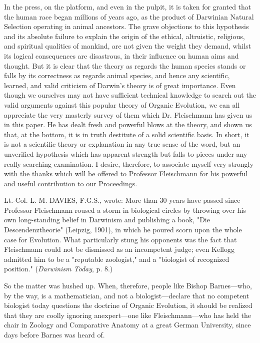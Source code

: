 In the press, on the platform, and even in the pulpit, it is taken for granted that the human
race began millions of years ago, as the product of Darwinian Natural Selection operating in
animal ancestors. The grave objections to this hypothesis and its absolute failure to explain
the origin of the ethical, altruistic, religious, and spiritual qualities of mankind, are not given
the weight they demand, whilst its logical consequences are disastrous, in their influence on
human aims and thought. But it is clear that the theory as regards the human species stands or
falls by its correctness as regards animal species, and hence any scientific, learned, and valid
criticism of Darwin's theory is of great importance. Even though we ourselves may not have
sufficient technical knowledge to search out the valid arguments against this popular theory
of Organic Evolution, we can all appreciate the very masterly survey of them which Dr.
Fleischmann has given us in this paper. He has dealt fresh and powerful blows at the theory,
and shown us that, at the bottom, it is in truth destitute of a solid scientific basis. In short, it is
not a scientific theory or explanation in any true sense of the word, but an unverified
hypothesis which has apparent strength but falls to pieces under any really searching
examination. I desire, therefore, to associate myself very strongly with the thanks which will
be offered to Professor Fleischmann for his powerful and useful contribution to our
Proceedings.

Lt.-Col. L. M. DAVIES, F.G.S., wrote: More than 30 years have passed since Professor
Fleischmann roused a storm in biological circles by throwing over his own long-standing
belief in Darwinism and publishing a book, "Die Descendenztheorie" (Leipzig, 1901), in
which he poured scorn upon the whole case for Evolution. What particularly stung his
opponents was the fact that Fleischmann could not be dismissed as an incompetent judge;
even Kellogg admitted him to be a "reputable zoologist," and a "biologist of recognized
position." (\textit{Darwinism Today}, p. 8.)

So the matter was hushed up. When, therefore, people like Bishop Barnes—who, by the way,
is a mathematician, and not a biologist—declare that no competent biologist today questions
the doctrine of Organic Evolution, it should be realized that they are coolly ignoring anexpert—one like Fleischmann—who has held the chair in Zoology and Comparative
Anatomy at a great German University, since days before Barnes was heard of.

